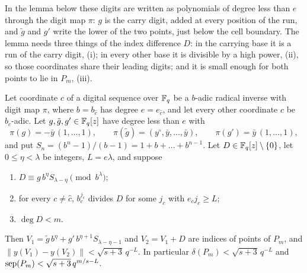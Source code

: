 In the lemma below these digits are written as polynomials of degree less than $e$ through the digit map $\pi$: $g$ is the carry digit, added at every position of the run, and $\tilde g$ and $g'$ write the lower of the two points, just below the cell boundary. The lemma needs three things of the index difference $D$: in the carrying base it is a run of the carry digit, (i); in every other base it is divisible by a high power, (ii), so those coordinates share their leading digits; and it is small enough for both points to lie in $P_m$, (iii).

\begin{lemma}\label{lem:carrypair}
Let coordinate $\hat c$ of a digital sequence over $\mathbb{F}_q$ be a $b$-adic radical inverse with digit map $\pi$, where $b=b_{\hat c}$ has degree $e=e_{\hat c}$, and let every other coordinate $c$ be $b_c$-adic. Let $g,\tilde g,g'\in\mathbb{F}_q[z]$ have degree less than $e$ with
\[
\pi(g)=-\bar y\,(1,\dots,1),\qquad\pi(\tilde g)=(y^\circ,\bar y,\dots,\bar y),\qquad\pi(g')=\bar y\,(1,\dots,1),
\]
and put $S_n=(b^n-1)/(b-1)=1+b+\dots+b^{n-1}$. Let $D\in\mathbb{F}_q[z]\setminus\{0\}$, let $0\le\eta<\lambda$ be integers, $L=e\lambda$, and suppose
\begin{enumerate}
\item[(i)] $D\equiv g\,b^\eta S_{\lambda-\eta}\pmod{b^\lambda}$;
\item[(ii)] for every $c\ne\hat c$, $b_c^{j_c}$ divides $D$ for some $j_c$ with $e_cj_c\ge L$;
\item[(iii)] $\deg D<m$.
\end{enumerate}
Then $V_1=\tilde g\,b^\eta+g'\,b^{\eta+1}S_{\lambda-\eta-1}$ and $V_2=V_1+D$ are indices of points of $P_m$, and $\|y(V_1)-y(V_2)\|<\sqrt{s+3}\,q^{-L}$. In particular $\delta(P_m)<\sqrt{s+3}\,q^{-L}$ and $\operatorname{sep}(P_m)<\sqrt{s+3}\,q^{m/s-L}$.
\end{lemma}

